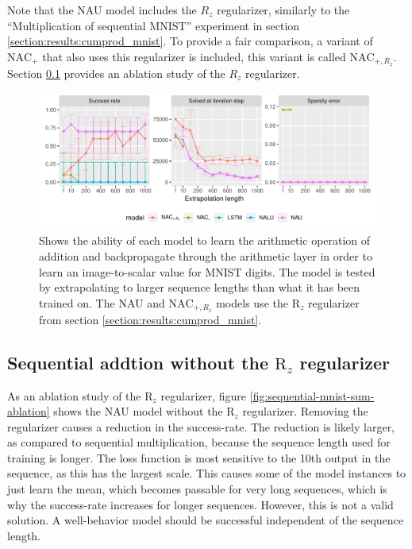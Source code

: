 Note that the NAU model includes the $R_z$ regularizer, similarly to the ``Multiplication of sequential MNIST'' experiment in section \ref{section:results:cumprod_mnist}. To provide a fair comparison, a variant of $\mathrm{NAC}_{+}$ that also uses this regularizer is included, this variant is called $\mathrm{NAC}_{+, R_z}$. Section \ref{sec:appendix:sequential-mnist-sum:ablation} provides an ablation study of the $R_z$ regularizer.

\begin{figure}[h]
\centering
\includegraphics[width=\linewidth,trim={0 0.5cm 0 0},clip]{paper/results/sequential_mnist_sum_long.pdf}
\caption{Shows the ability of each model to learn the arithmetic operation of addition and backpropagate through the arithmetic layer in order to learn an image-to-scalar value for MNIST digits. The model is tested by extrapolating to larger sequence lengths than what it has been trained on. The NAU and $\mathrm{NAC}_{+,R_z}$ models use the $\mathrm{R}_z$ regularizer from section \ref{section:results:cumprod_mnist}.}
\label{fig:sequential-mnist-sum}
\end{figure}

\subsection{Sequential addtion without the \texorpdfstring{$\mathrm{R}_z$}{R\_z} regularizer}
\label{sec:appendix:sequential-mnist-sum:ablation}

As an ablation study of the $\mathrm{R}_z$ regularizer, figure \ref{fig:sequential-mnist-sum-ablation} shows the NAU model without the $\mathrm{R}_z$ regularizer. Removing the regularizer causes a reduction in the success-rate. The reduction is likely larger, as compared to sequential multiplication, because the sequence length used for training is longer. The loss function is most sensitive to the 10th output in the sequence, as this has the largest scale. This causes some of the model instances to just learn the mean, which becomes passable for very long sequences, which is why the success-rate increases for longer sequences. However, this is not a valid solution. A well-behavior model should be successful independent of the sequence length.

